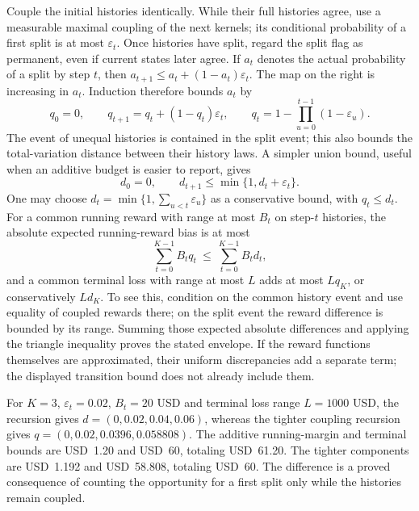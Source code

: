 Couple the initial histories identically. While their full histories agree,
use a measurable maximal coupling of the next kernels; its conditional
probability of a first split is at most $\varepsilon_t$. Once histories have
split, regard the split flag as permanent, even if current states later agree.
If $a_t$ denotes the actual probability of a split by step $t$, then
$a_{t+1}\leq a_t+(1-a_t)\varepsilon_t$. The map on the right is increasing
in $a_t$. Induction therefore bounds $a_t$ by
\begin{equation}
 q_0=0,\qquad q_{t+1}=q_t+(1-q_t)\varepsilon_t,
 \qquad q_t=1-\prod_{u=0}^{t-1}(1-\varepsilon_u).
 \label{exec17:s5-coupling-recursion}
\end{equation}
The event of unequal histories is contained in the split event; this also
bounds the total-variation distance between their history laws. A simpler
union bound, useful when an additive budget is easier to report, gives
\begin{equation}
 d_0=0,\qquad d_{t+1}\leq\min\{1,d_t+\varepsilon_t\}.
 \label{exec17:s5-tv-recursion}
\end{equation}
One may choose $d_t=\min\{1,\sum_{u<t}\varepsilon_u\}$ as a conservative
bound, with $q_t\leq d_t$. For a common running reward with range at most
$B_t$ on step-$t$ histories, the absolute
expected running-reward bias is at most
\begin{equation}
 \sum_{t=0}^{K-1}B_t q_t\ \leq\ \sum_{t=0}^{K-1}B_t d_t,
 \label{exec17:s5-running-bound}
\end{equation}
and a common terminal loss with range at most $L$ adds at most $Lq_K$,
or conservatively $Ld_K$. To see this,
condition on the common history event and use equality of coupled rewards
there; on the split event the reward difference is bounded by its range.
Summing those expected absolute differences and applying the triangle
inequality proves the stated envelope. If the reward functions themselves
are approximated, their uniform discrepancies add a separate term; the
displayed transition bound does not already include them.

For $K=3$, $\varepsilon_t=0.02$, $B_t=20$ USD and terminal loss range
$L=1000$ USD, the recursion gives
$d=(0,0.02,0.04,0.06)$, whereas the tighter coupling recursion gives
$q=(0,0.02,0.0396,0.058808)$. The additive running-margin and terminal
bounds are USD~1.20 and USD~60, totaling USD~61.20. The tighter components
are USD~1.192 and USD~58.808, totaling USD~60. The difference is a proved
consequence of counting the opportunity for a first split only while the
histories remain coupled.\citep{exec17_s5_joint_error}

